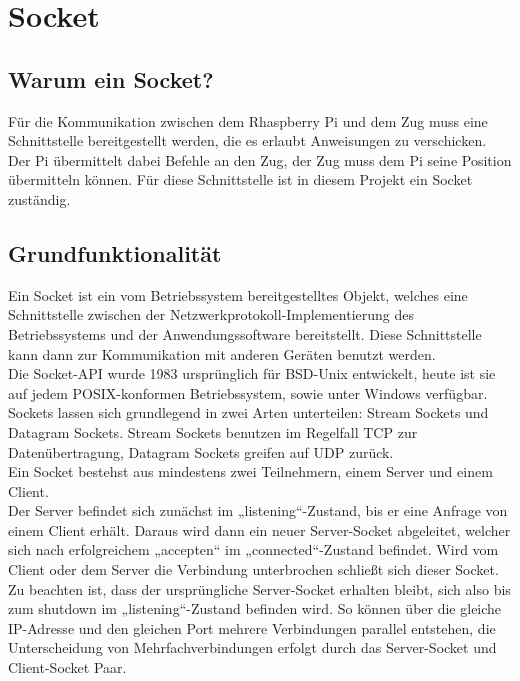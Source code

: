 \chapter{Socket}

\section{Warum ein Socket?}

Für die Kommunikation zwischen dem Rhaspberry Pi und dem Zug muss eine Schnittstelle bereitgestellt werden, die es erlaubt Anweisungen zu verschicken. Der Pi übermittelt dabei Befehle an den Zug, der Zug muss dem Pi seine Position übermitteln können.
Für diese Schnittstelle ist in diesem Projekt ein Socket zuständig.

\section{Grundfunktionalität}
\label{sec:grundfunktionalität}

Ein Socket ist ein vom Betriebssystem bereitgestelltes Objekt, welches eine Schnittstelle zwischen der Netzwerkprotokoll-Implementierung des Betriebssystems und der Anwendungssoftware bereitstellt. Diese Schnittstelle kann dann zur Kommunikation mit anderen Geräten benutzt werden.\\
Die Socket-API wurde 1983 ursprünglich für BSD-Unix entwickelt, heute ist sie auf jedem POSIX-konformen Betriebssystem, sowie unter Windows verfügbar.\\
Sockets lassen sich grundlegend in zwei Arten unterteilen: Stream Sockets und Datagram Sockets. Stream Sockets benutzen im Regelfall TCP zur Datenübertragung, Datagram Sockets greifen auf UDP zurück.\\
Ein Socket bestehst aus mindestens zwei Teilnehmern, einem Server und einem Client. \\
Der Server befindet sich zunächst im „listening“-Zustand, bis er eine Anfrage von einem Client erhält. Daraus wird dann ein neuer Server-Socket abgeleitet, welcher sich nach erfolgreichem „accepten“ im „connected“-Zustand befindet. Wird vom Client oder dem Server die Verbindung unterbrochen schließt sich dieser Socket.\\
Zu beachten ist, dass der ursprüngliche Server-Socket erhalten bleibt, sich also bis zum shutdown im „listening“-Zustand befinden wird. So können über die gleiche IP-Adresse und den gleichen Port mehrere Verbindungen parallel entstehen, die Unterscheidung von Mehrfachverbindungen erfolgt durch das Server-Socket und Client-Socket Paar.

